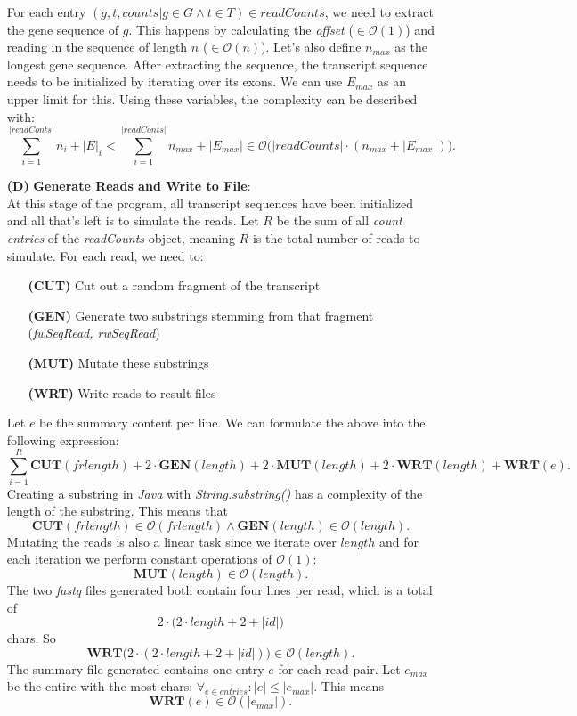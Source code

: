 \documentclass[12pt]{article}
\begin{document}
\begin{enumerate}
		For each entry $(g, t, counts | g \in G \land t \in T) \in readCounts$, we need to extract the gene sequence of $g$.
		This happens by calculating the \textit{offset} ($\in \mathcal{O}(1)$) and reading in the sequence of length $n$ ($\in \mathcal{O}(n)$).
		Let's also define $n_{max}$ as the longest gene sequence.
		After extracting the sequence, the transcript sequence needs to be initialized by iterating over its exons.
		We can use $E_{max}$ as an upper limit for this.
		Using these variables, the complexity can be described with:
		\[
			\sum_{i=1}^{|readConts|} n_{i} + |E|_{i} < \sum_{i=1}^{|readConts|} n_{max} + |E_{max}| \in \mathcal{O}\Big(|readCounts| \cdot (n_{max} + |E_{max}|)\Big)
			.\]
	\item[\textbf{(D)}] \textbf{Generate Reads and Write to File}:\\
		At this stage of the program, all transcript sequences have been initialized and all that's left is to simulate the reads.
		Let $R$ be the sum of all \textit{count entries} of the \textit{readCounts} object, meaning $R$ is the total number of reads to
		simulate. For each read, we need to:
		\begin{enumerate}
			\item[\textbf{(CUT)}] Cut out a random fragment of the transcript
			\item[\textbf{(GEN)}] Generate two substrings stemming from that fragment (\textit{fwSeqRead, rwSeqRead})
			\item[\textbf{(MUT)}] Mutate these substrings
			\item[\textbf{(WRT)}] Write reads to result files
		\end{enumerate}
		Let $e$ be the summary content per line. We can formulate the above into the following expression:
		\[
			\sum_{i=1}^{R} \mathbf{CUT}(frlength) + 2 \cdot \mathbf{GEN}(length) + 2 \cdot \mathbf{MUT}(length) + 2 \cdot \mathbf{WRT}(length) + \mathbf{WRT}(e)
			.\]
		Creating a substring in \textit{Java} with \textit{String.substring()} has a complexity of the length of the substring.
		This means that
		\[
			\mathbf{CUT}(frlength) \in \mathcal{O}(frlength) \land \mathbf{GEN}(length) \in \mathcal{O}(length)
			.\]
		Mutating the reads is also a linear task since we iterate over $length$ and for each iteration we perform
		constant operations of $\mathcal{O}(1)$:
		\[
			\mathbf{MUT}(length) \in \mathcal{O}(length)
			.\]
		The two \textit{fastq} files generated both contain four lines per read, which is a total of
		\[
			2 \cdot \big(2 \cdot length + 2 + |id|\big)
		\]
		chars. So
		\[
			\mathbf{WRT}\big(2 \cdot (2 \cdot length + 2 + |id|)\big) \in \mathcal{O}(length)
			.\]
		The summary file generated contains one entry $e$ for each read pair. Let $e_{max}$ be the entire with the most chars: $\forall_{e \in entries}: |e| \le |e_{max}|$.
		This means
		\[
			\mathbf{WRT}(e) \in \mathcal{O}(|e_{max}|)
			.\]


\end{enumerate}
\end{document}
